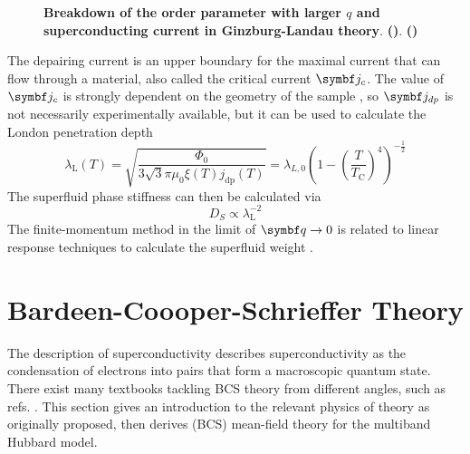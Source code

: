 \documentclass[../notes.tex]{subfiles}
\begin{document}
\begin{figure}[t]
	\centering
	\begin{subfigure}[b]{0.5\textwidth}
		\caption{\hfill\null}\label{sfig:Ginzburg Landau OP vs q}
		\centering
		
	\end{subfigure}%
	\hfill
	\begin{subfigure}[b]{0.5\textwidth}
		\centering
		\caption{\hfill\null}\label{sfig:Ginzburg Landau current vs q}
		
	\end{subfigure}
	\caption{\textbf{Breakdown of the order parameter with larger \(q\) and superconducting current in Ginzburg-Landau theory}. \textbf{()}. \textbf{()}}
	\label{fig:Ginzburg Landau OP and current vs q}
\end{figure}
The depairing current is an upper boundary for the maximal current that can flow through a material, also called the critical current \(\vb{j}_c\).
The value of \(\vb{j}_c\) is strongly dependent on the geometry of the sample \cite{bardeenCriticalFieldsCurrents1962, xuAchievingTheoreticalDepairing2010}, so \(\vb{j}_{dp}\) is not necessarily experimentally available, but it can be used to calculate the London penetration depth \cite{tinkhamIntroductionSuperconductivity1996}
\begin{equation}
	\lambda_{\mathrm{L}} (T) = \sqrt{\frac{\Phi_0}{3 \sqrt{3} \pi \mu_0 \xi(T) j_{\mathrm{dp}} (T)}} = \lambda_{L,0} \left( 1 - \left( \frac{T}{T_{\mathrm{C}}}\right)^4 \right)^{-\frac{1}{2}} 
\end{equation}
The superfluid phase stiffness can then be calculated via
\begin{equation}
	D_S \propto \lambda_{\mathrm{L}}^{-2}
\end{equation}
The finite-momentum method in the limit of \(\vb{q} \to 0\) is related to linear response techniques to calculate the superfluid weight \cite{peottaSuperfluidityTopologicallyNontrivial2015, liangBandGeometryBerry2017}.

\section{Bardeen-Coooper-Schrieffer Theory}\label{sec:bcs-theory}

The  description of superconductivity describes superconductivity as the condensation of electrons into pairs that form a macroscopic quantum state.
There exist many textbooks tackling BCS theory from different angles, such as refs. \cite{colemanIntroductionManyBodyPhysics2015, tinkhamIntroductionSuperconductivity1996}.
This section gives an introduction to the relevant physics of  theory as originally proposed, then derives (BCS) mean-field theory for the multiband Hubbard model.
\end{document}
